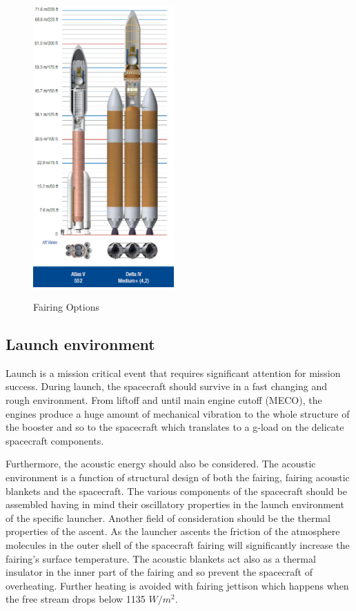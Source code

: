\begin{figure}[htb!]
{        \includegraphics[width=0.48\textwidth]{figures/Orbiter/launchv.png}
        \label{fig:fairings_v_iv_compare}
    }
    \caption{Fairing Options}\label{fig:fairings}
\end{figure}
\subsection{Launch environment}
Launch is a mission critical event that requires significant attention for mission success. During launch, the spacecraft should survive in a fast changing and rough environment. From liftoff and until main engine cutoff (MECO), the engines produce a huge amount of mechanical vibration to the whole structure of the booster and so to the spacecraft which translates to a g-load on the delicate spacecraft components. 

Furthermore, the acoustic energy should also be considered. The acoustic environment is a function of structural design of both the fairing, fairing acoustic blankets and the spacecraft. The various components of the spacecraft should be assembled having in mind their oscillatory properties in the launch environment of the specific launcher. Another field of consideration should be the thermal properties of the ascent. As the launcher ascents the friction of the atmosphere molecules in the outer shell of the spacecraft fairing will significantly increase the fairing’s surface temperature. The acoustic blankets act also as a thermal insulator in the inner part of the fairing and so prevent the spacecraft of overheating. Further heating is avoided with fairing jettison which happens when the free stream drops below 1135 $W/m^2$\cite{Atlasm}.

